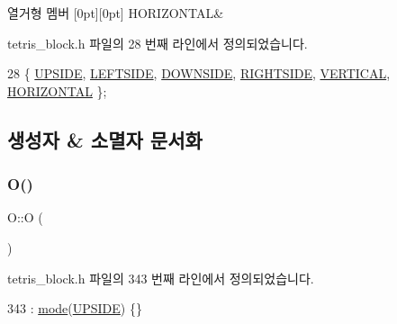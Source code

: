 \begin{DoxyEnumFields}{열거형 멤버}
[0pt][0pt]{}\mbox{\label{class_block_a33a96023993478ad4b52426188454765a883bda1b4a0cb6d25d8b3c3465f0cfef}} 
H\+O\+R\+I\+Z\+O\+N\+T\+AL&\\
\hline

\end{DoxyEnumFields}


tetris\+\_\+block.\+h 파일의 28 번째 라인에서 정의되었습니다.


\begin{DoxyCode}
28 \{ \mbox{\hyperlink{class_block_a33a96023993478ad4b52426188454765a4529e89ca1c08cc5f81181e355719fad}{UPSIDE}}, \mbox{\hyperlink{class_block_a33a96023993478ad4b52426188454765a9c855bf91465e7da98901d7900740919}{LEFTSIDE}}, \mbox{\hyperlink{class_block_a33a96023993478ad4b52426188454765a73fd4ad0ff8642235ec8549f9290d13b}{DOWNSIDE}}, \mbox{\hyperlink{class_block_a33a96023993478ad4b52426188454765a005424e665ea0b83edfaf9ddb3ab85a1}{RIGHTSIDE}}, \mbox{\hyperlink{class_block_a33a96023993478ad4b52426188454765a76628d7877667ccb2f6e549b89466a4a}{VERTICAL}}, 
      \mbox{\hyperlink{class_block_a33a96023993478ad4b52426188454765a883bda1b4a0cb6d25d8b3c3465f0cfef}{HORIZONTAL}} \}; 
\end{DoxyCode}


\subsection{생성자 \& 소멸자 문서화}
\mbox{\label{class_o_a44ab6b2c383356dff9624cbc12290495}} 
\subsubsection{\texorpdfstring{O()}{O()}}
{\footnotesize\ttfamily O\+::O (\begin{DoxyParamCaption}{ }\end{DoxyParamCaption})\hspace{0.3cm}{\ttfamily [inline]}}



tetris\+\_\+block.\+h 파일의 343 번째 라인에서 정의되었습니다.


\begin{DoxyCode}
343 : \mbox{\hyperlink{class_o_a8eab599843636b7f2f16ba71defceb45}{mode}}(\mbox{\hyperlink{class_block_a33a96023993478ad4b52426188454765a4529e89ca1c08cc5f81181e355719fad}{UPSIDE}}) \{\}
\end{DoxyCode}


